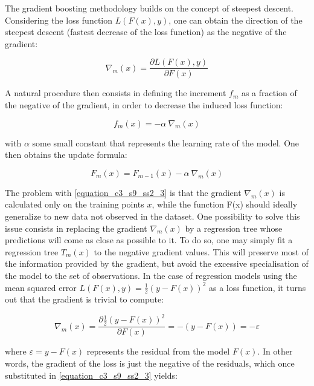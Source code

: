 The gradient boosting methodology builds on the concept of steepest descent. Considering the loss function $L(F(x),y)$, one can obtain the direction of the steepest descent (fastest decrease of the loss function) as the negative of the gradient:

\begin{equation}
\nabla_m (x) = \frac{\partial L(F(x),y)}{\partial F(x)}
\label{equation_c3_s9_ss2_1} 
\end{equation}

A natural procedure then consists in defining the increment $f_m$ as a fraction of the negative of the gradient, in order to decrease the induced loss function:

\begin{equation}
f_m(x) = - \alpha \ \nabla_m (x)
\label{equation_c3_s9_ss2_2} 
\end{equation}

with $\alpha$ some small constant that represents the learning rate of the model. One then obtains the update formula:

\begin{equation}
F_{m} (x) = F_{m-1} (x) - \alpha \ \nabla_m (x)
\label{equation_c3_s9_ss2_3}
\end{equation}

The problem with \ref{equation_c3_s9_ss2_3} is that the gradient $\nabla_m (x)$ is calculated only on the training points $x$, while the function F(x) should ideally generalize to new data not observed in the dataset. One possibility to solve this issue consists in replacing the gradient $\nabla_m (x)$ by a regression tree whose predictions will come as close as possible to it. To do so, one may simply fit a regression tree $T_m(x)$ to the negative gradient values. This will preserve most of the information provided by the gradient, but avoid the excessive specialisation of the model to the set of observations. In the case of regression models using the mean squared error $L(F(x),y) = \frac{1}{2} (y - F(x))^2$ as a loss function, it turns out that the gradient is trivial to compute:

\begin{equation}
\nabla_m (x) = \frac{\partial \frac{1}{2} (y - F(x))^2}{\partial F(x)} = - (y - F(x)) = - \varepsilon
\label{equation_c3_s9_ss2_4}
\end{equation}

where $\varepsilon = y - F(x)$ represents the residual from the model $F(x)$. In other words, the gradient of the loss is just the negative of the residuals, which once substituted in \ref{equation_c3_s9_ss2_3} yields:

